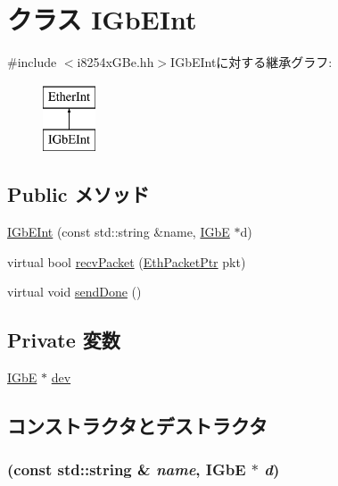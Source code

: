\hypertarget{classIGbEInt}{
\section{クラス IGbEInt}
\label{classIGbEInt}
}


{\ttfamily \#include $<$i8254xGBe.hh$>$}IGbEIntに対する継承グラフ:\begin{figure}[H]
\begin{center}
\leavevmode
\includegraphics[height=2cm]{classIGbEInt}
\end{center}
\end{figure}
\subsection*{Public メソッド}
\begin{DoxyCompactItemize}
\item 
\hyperlink{classIGbEInt_a8680285b5800463f07aeca5d354743f7}{IGbEInt} (const std::string \&name, \hyperlink{classIGbE}{IGbE} $\ast$d)
\item 
virtual bool \hyperlink{classIGbEInt_a9bd96a108d6f58f140c9f7d83726eebe}{recvPacket} (\hyperlink{classRefCountingPtr}{EthPacketPtr} pkt)
\item 
virtual void \hyperlink{classIGbEInt_a967489e0b2900f4b12d99e6257d24dbe}{sendDone} ()
\end{DoxyCompactItemize}
\subsection*{Private 変数}
\begin{DoxyCompactItemize}
\item 
\hyperlink{classIGbE}{IGbE} $\ast$ \hyperlink{classIGbEInt_a98d2ca35267d7f0e3548330b6311cb1c}{dev}
\end{DoxyCompactItemize}


\subsection{コンストラクタとデストラクタ}
\hypertarget{classIGbEInt_a8680285b5800463f07aeca5d354743f7}{
\subsubsection[{IGbEInt}]{ (const std::string \& {\em name}, \/  {\bf IGbE} $\ast$ {\em d})}}
\label{classIGbEInt_a8680285b5800463f07aeca5d354743f7}



